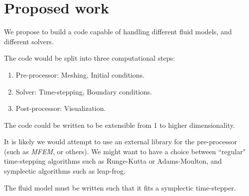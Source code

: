 \section{Proposed work}

We propose to build a code capable of handling different fluid models, and different solvers.

The code would be split into three computational steps: 
\noindent
\begin{enumerate}
\item Pre-processor: \newline
Meshing, Initial conditions.

\item Solver: \newline
Time-stepping, Boundary conditions.

\item Post-processor: \newline
Visualization.

\end{enumerate}

The code could be written to be extensible from 1 to higher dimensionality.

It is likely we would attempt to use an external library for the pre-processor (such as \textit{MFEM}, or others).
We might want to have a choice between ``regular" time-stepping algorithms such as Runge-Kutta or Adams-Moulton, and symplectic algorithms such as leap-frog.

The fluid model must be written such that it fits a symplectic time-stepper.


